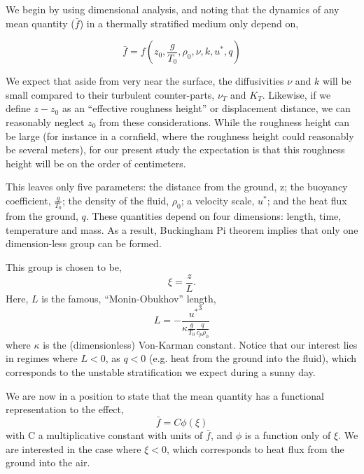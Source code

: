 %
%

We begin by using dimensional analysis, and noting that the dynamics of
any mean quantity ($\bar f$) in a thermally stratified medium only depend on,

\begin{equation}
\bar f = f(z_0,\frac{g}{T_0},\rho_0,\nu,k,u^*,q)
\end{equation}

We expect that aside from very near the surface, the diffusivities $\nu$
and $k$ will be small compared to their turbulent counter-parts, $\nu_T$
and $K_T$. Likewise, if we define $z-z_0$ as an ``effective roughness
height'' or displacement distance, we can reasonably neglect $z_0$ from these
considerations. While the roughness height can be large (for instance in
a cornfield, where the roughness height could reasonably be several
meters), for our present study the expectation is that this roughness
height will be on the order of centimeters\cite{}. 

This leaves only five parameters: the distance from the ground, z; the
buoyancy coefficient, $\frac{g}{T_0}$; the density of the fluid,
$\rho_0$; a velocity scale, $u^*$; and the heat flux from the ground,
$q$. 
%
% 
These quantities depend on
four dimensions: length, time, temperature and mass. As a result,
Buckingham Pi theorem implies that only one dimension-less group can be
formed\cite{}.%

This group is chosen to be,
\begin{equation}
 \xi = \frac{z}{L}.
\end{equation}
Here, $L$ is the famous, ``Monin-Obukhov'' length,
\begin{equation}
 L = -\frac{{u^*}^3}{\kappa \frac{g}{T_0} \frac{q}{c_p \rho_0}}
\end{equation}
where $\kappa$ is the (dimensionless) Von-Karman constant. Notice that
our interest lies in regimes where $L<0$, as $q<0$ (e.g. heat from the
ground into the fluid), which corresponds to the unstable stratification 
we expect during a sunny day. 

We are now in a position to state that the mean quantity has a
functional representation to the effect,
\begin{equation}
 \bar f = C \phi(\xi)
\end{equation}
with C a multiplicative constant with units of $\bar f$, and $\phi$ is a
function only of $\xi$. We are interested in the case where $\xi<0$, which
corresponds to heat flux from the ground into the air.  

